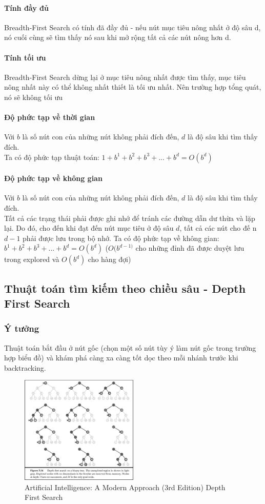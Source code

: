 \documentclass{article}
\begin{document}
\paragraph{Tính đầy đủ}
Breadth-First Search có tính đã đầy đủ - nếu nút mục tiêu nông nhất ở độ sâu d, nó cuối cùng sẽ tìm thấy nó sau khi mở rộng tất cả các nút nông hơn d.
\paragraph{Tính tối ưu}
Breadth-First Search dừng lại ở mục tiêu nông nhất được tìm thấy, mục tiêu nông nhất này có thể không nhất thiết là tối ưu nhất. Nên trường hợp tổng quát, nó sẽ không tối ưu
\paragraph{Độ phức tạp về thời gian}
Với $b$ là số nút con của những nút không phải đích đến, $d$ là độ sâu khi tìm thấy đích.\\
Ta có độ phức tạp thuật toán: $1 + b^1 + b^2 + b^3 + ... + b^d = O(b^d)$
\paragraph{Độ phức tạp về không gian}
Với $b$ là số nút con của những nút không phải đích đến, $d$ là độ sâu khi tìm thấy đích.\\
Tất cả các trạng thái phải được ghi nhớ để tránh các đường dẫn dư thừa và lặp lại. Do đó, cho đến khi đạt đến nút mục tiêu ở độ sâu $d$, tất cả các nút cho đế n$d-1$ phải được lưu trong bộ nhớ.
Ta có độ phức tạp về không gian: $b^1 + b^2 + b^3 + ... + b^d = O(b^d)$ ($ O(b^{d-1)}$ cho những đỉnh đã được duyệt lưu trong explored và  $O(b^{d})$ cho hàng đợi)
\subsection{Thuật toán tìm kiếm theo chiều sâu - Depth First Search}

\subsubsection{Ý tưởng}
Thuật toán bắt đầu ở nút gốc (chọn một số nút tùy ý làm nút gốc trong trường hợp biểu đồ) và khám phá càng xa càng tốt dọc theo mỗi nhánh trước khi backtracking.

\begin{figure}[H]
\centering
\includegraphics[width=0.5\textwidth]{23-Figure3.16-1.png}
\caption{Artificial Intelligence: A Modern Approach (3rd Edition) Depth First Search}
\end{figure}
\end{document}
